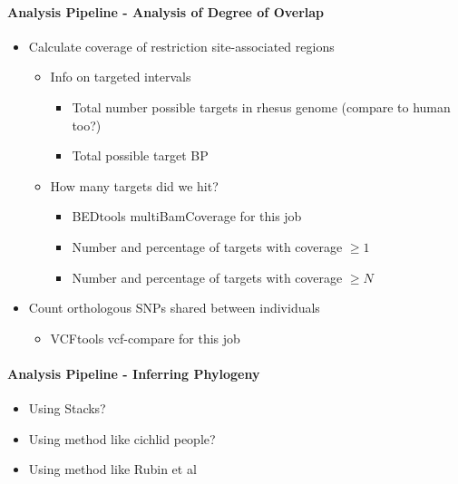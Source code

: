 \documentclass[12pt]{article}
\begin{document}
\paragraph{Analysis Pipeline - Analysis of Degree of Overlap}
\begin{itemize}
	\item Calculate coverage of restriction site-associated regions
	\begin{itemize}
		\item Info on targeted intervals
		\begin{itemize}
			\item Total number possible targets in rhesus genome (compare to human too?)
			\item Total possible target BP
		\end{itemize}
		\item How many targets did we hit?
		\begin{itemize}
			\item BEDtools multiBamCoverage for this job
			\item Number and percentage of targets with coverage $\ge 1$
			\item Number and percentage of targets with coverage $\ge N$
		\end{itemize}
	\end{itemize}
	\item Count orthologous SNPs shared between individuals
	\begin{itemize}
		\item VCFtools vcf-compare for this job
	\end{itemize}
\end{itemize}

\paragraph{Analysis Pipeline - Inferring Phylogeny}
\begin{itemize}
	\item Using Stacks? 
	\item Using method like cichlid people?
	\item Using method like Rubin et al %
\end{itemize}
\end{document}
